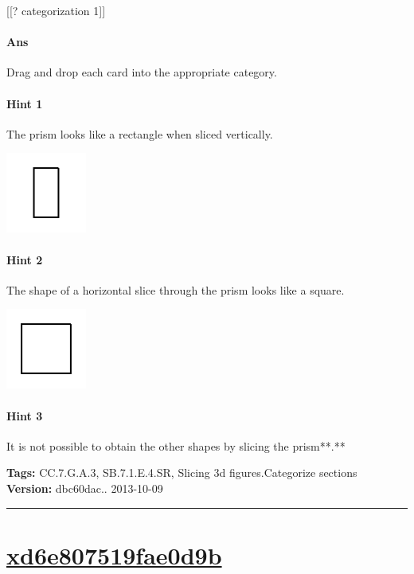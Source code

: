 \documentclass[twocolumn,10pt]{article}
\def\shrinkfactor{0.4}
\begin{document}
[[? categorization 1]]

\paragraph{Ans} Drag and drop each card into the appropriate category. 

\paragraph{Hint 1}The prism looks like a rectangle when sliced vertically.  

\includegraphics[scale=\shrinkfactor]{figures/225bc3d058cebe2059fc56f78ef80b5f3e0f2da7.png}

\paragraph{Hint 2}The shape of a horizontal slice through the prism looks like a square.  

\includegraphics[scale=\shrinkfactor]{figures/4b59a0ece6acc7c19c389e1de534d1df93bf1169.png}

\paragraph{Hint 3}It is not possible to obtain the other shapes by slicing the prism**.**



\medskip
\noindent
\textbf{Tags:} {\footnotesize CC.7.G.A.3, SB.7.1.E.4.SR, Slicing 3d figures.Categorize sections}\\
\textbf{Version:} dbc60dac.. 2013-10-09
\smallskip\hrule





\section{\href{https://www.khanacademy.org/devadmin/content/items/xd6e807519fae0d9b}{xd6e807519fae0d9b}}
\end{document}
